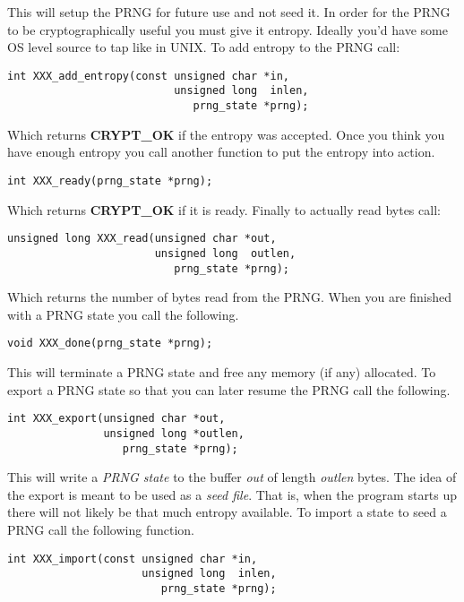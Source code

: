 \documentclass[synpaper]{book}
\begin{document}
This will setup the PRNG for future use and not seed it.  In order for the PRNG to be cryptographically useful you must give it 
entropy.  Ideally you'd have some OS level source to tap like in UNIX.  To add entropy to the PRNG call:
\begin{verbatim}
int XXX_add_entropy(const unsigned char *in, 
                          unsigned long  inlen, 
                             prng_state *prng);
\end{verbatim}
Which returns {\bf CRYPT\_OK} if the entropy was accepted.  Once you think you have enough entropy you call another
function to put the entropy into action.
\begin{verbatim}
int XXX_ready(prng_state *prng);
\end{verbatim}

Which returns {\bf CRYPT\_OK} if it is ready.  Finally to actually read bytes call:
\begin{verbatim}
unsigned long XXX_read(unsigned char *out, 
                       unsigned long  outlen,
                          prng_state *prng);
\end{verbatim}

Which returns the number of bytes read from the PRNG.  When you are finished with a PRNG state you call
the following.

\begin{verbatim}
void XXX_done(prng_state *prng);
\end{verbatim}

This will terminate a PRNG state and free any memory (if any) allocated.  To export a PRNG state
so that you can later resume the PRNG call the following.

\begin{verbatim}
int XXX_export(unsigned char *out, 
               unsigned long *outlen, 
                  prng_state *prng);
\end{verbatim}

This will write a \textit{PRNG state} to the buffer \textit{out} of length \textit{outlen} bytes.  The idea of 
the export is meant to be used as a \textit{seed file}.  That is, when the program starts up there will not likely
be that much entropy available.   To import a state to seed a PRNG call the following function.

\begin{verbatim}
int XXX_import(const unsigned char *in, 
                     unsigned long  inlen, 
                        prng_state *prng);
\end{verbatim}
\end{document}
